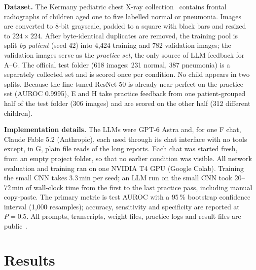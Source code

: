 \documentclass[runningheads]{llncs}
\newcommand{\Astra}{GPT-6 Astra}
\begin{document}
\noindent\textbf{Dataset.}
The Kermany pediatric chest X-ray collection~\cite{kermany2018} contains frontal radiographs of children aged one to five labelled normal or pneumonia.
Images are converted to 8-bit grayscale, padded to a square with black bars and resized to $224\times224$.
After byte-identical duplicates are removed, the training pool is split \emph{by patient} (seed 42) into 4,424 training and 782 validation images; the validation images serve as the \emph{practice set}, the only source of LLM feedback for A--G.
The official test folder (618 images: 231 normal, 387 pneumonia) is a separately collected set and is scored once per condition.
No child appears in two splits.
Because the fine-tuned ResNet-50 is already near-perfect on the practice set (AUROC 0.9995), E and H take practice feedback from one patient-grouped half of the test folder (306 images) and are scored on the other half (312 different children).

\noindent\textbf{Implementation details.}
The LLMs were \Astra{} and, for one F chat, Claude Fable 5.2 (Anthropic), each used through its chat interface with no tools except, in G, plain file reads of the long reports.
Each chat was started fresh, from an empty project folder, so that no earlier condition was visible.
All network evaluation and training ran on one NVIDIA T4 GPU (Google Colab).
Training the small CNN takes 3.3\,min per seed; an LLM run on the small CNN took 20--72\,min of wall-clock time from the first to the last practice pass, including manual copy-paste.
The primary metric is test AUROC with a 95\,\% bootstrap confidence interval (1,000 resamples); accuracy, sensitivity and specificity are reported at $P{=}0.5$.
All prompts, transcripts, weight files, practice logs and result files are public~\cite{repo}.

\section{Results}
\end{document}
